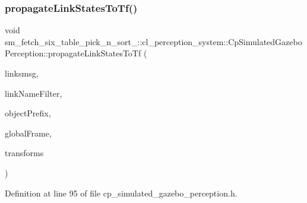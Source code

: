 \subsubsection{\texorpdfstring{propagate\+Link\+States\+To\+Tf()}{propagateLinkStatesToTf()}}
{\footnotesize\ttfamily void sm\+\_\+fetch\+\_\+six\+\_\+table\+\_\+pick\+\_\+n\+\_\+sort\+\_\+::cl\+\_\+perception\+\_\+system\+::\+Cp\+Simulated\+Gazebo\+Perception\+::propagate\+Link\+States\+To\+Tf (\begin{DoxyParamCaption}\item[{const gazebo\+\_\+msgs\+::\+Link\+States \&}]{linksmsg,  }\item[{std\+::string}]{link\+Name\+Filter,  }\item[{std\+::string}]{object\+Prefix,  }\item[{std\+::string}]{global\+Frame,  }\item[{std\+::vector$<$ tf\+::\+Stamped\+Transform $>$ \&}]{transforms }\end{DoxyParamCaption})\hspace{0.3cm}{\ttfamily [inline]}}



Definition at line 95 of file cp\+\_\+simulated\+\_\+gazebo\+\_\+perception.\+h.


